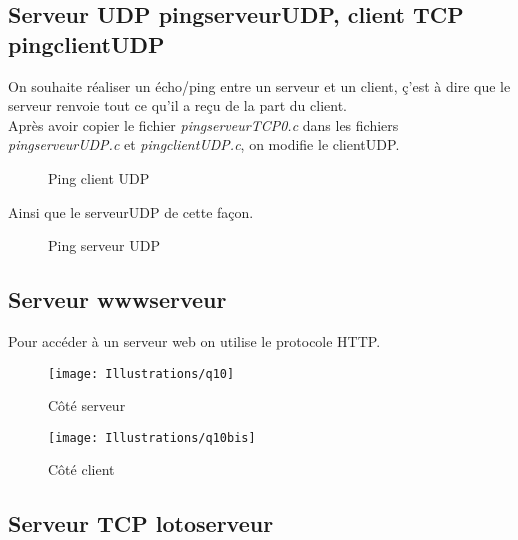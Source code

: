 \documentclass[paper=a4, fontsize=12pt]{article}
\numberwithin{equation}{section}		%
\numberwithin{figure}{section}			%
\numberwithin{table}{section}				%
\begin{document}
\subsection{Serveur UDP pingserveurUDP, client TCP pingclientUDP}
On souhaite réaliser un écho/ping entre un serveur et un client, ç'est à dire que le serveur renvoie tout ce qu'il a reçu de la part du client. 
\\Après avoir copier le fichier \textit{pingserveurTCP0.c} dans les fichiers  \textit{pingserveurUDP.c} et  \textit{pingclientUDP.c}, on modifie le clientUDP.

\begin{figure}[h!]
\caption{\label{Illustrations/decoupage_etapes_2}Ping client UDP}
\end{figure}
Ainsi que le serveurUDP de cette façon.
\begin{figure}[h!]
\caption{\label{Illustrations/decoupage_etapes_2}Ping serveur UDP}
\end{figure}

\subsection{Serveur wwwserveur}
Pour accéder à un serveur web on utilise le protocole HTTP.
\begin{figure}[h!]
\centerline{\texttt{[image: Illustrations/q10]}}
\caption{\label{Illustrations/q10} Côté serveur}
\end{figure}
\begin{figure}[h!]
\centerline{\texttt{[image: Illustrations/q10bis]}}
\caption{\label{Illustrations/q10bis} Côté client}
\end{figure}
\subsection{Serveur TCP lotoserveur}

\end{document}
